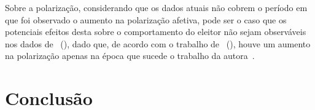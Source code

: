 \documentclass[
	12pt,				%
	openright,			%
	twoside,			%
	a4paper,			%
	openany,
	english,			%
	brazil				%
	]{abntex2}
\begin{document}
Sobre a polarização, considerando que os dados atuais não cobrem o período em que foi observado o aumento na polarização afetiva, pode ser o caso que os potenciais efeitos desta sobre o comportamento do eleitor não sejam observáveis nos dados de ~(\citeyear{Brollo2013Aug}), dado que, de acordo com o trabalho de ~(\citeyear{fuks2020afeto}), houve um aumento na polarização apenas na época que sucede o trabalho da autora~\cite{Brollo2013Aug}.

\chapter{Conclusão}











\end{document}
